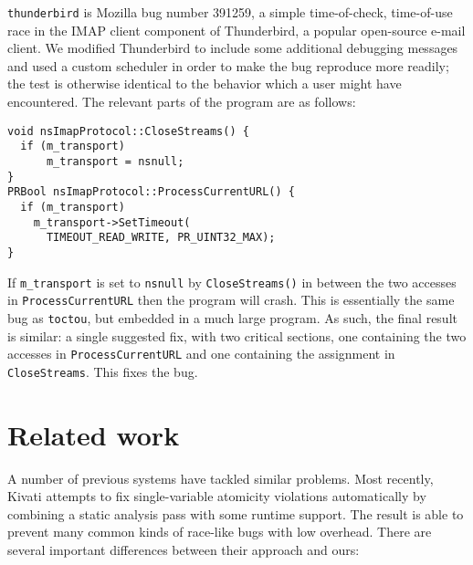 \documentclass[10pt,twocolumn,preprint,natbib,authoryear]{sigplanconf}
\newcommand{\editorial}[1]{}
\begin{document}
\verb|thunderbird| is Mozilla bug number
391259\cite{thunderbird39125}, a simple time-of-check, time-of-use
race in the IMAP client component of Thunderbird, a popular
open-source e-mail client.  We modified Thunderbird to include some
additional debugging messages and used a custom scheduler in order to
make the bug reproduce more readily; the test is otherwise identical
to the behavior which a user might have encountered.  The relevant
parts of the program are as follows:

\begin{verbatim}
void nsImapProtocol::CloseStreams() {
  if (m_transport)
      m_transport = nsnull;
}
PRBool nsImapProtocol::ProcessCurrentURL() {
  if (m_transport)
    m_transport->SetTimeout(
      TIMEOUT_READ_WRITE, PR_UINT32_MAX);
}
\end{verbatim}

\noindent
If \verb|m_transport| is set to \verb|nsnull| by \verb|CloseStreams()|
in between the two accesses in \verb|ProcessCurrentURL| then the
program will crash.  This is essentially the same bug as
\verb|toctou|, but embedded in a much large program.  As such, the
final result is similar: a single suggested fix, with two critical
sections, one containing the two accesses in \verb|ProcessCurrentURL|
and one containing the assignment in \verb|CloseStreams|.  This fixes
the bug.

\section{Related work}\editorial{This is a bit of a bestiary.  Could do with a bit more analysis.}

A number of previous systems have tackled similar problems.  Most
recently, Kivati\cite{Chew2010a} attempts to fix single-variable
atomicity violations automatically by combining a static analysis pass
with some runtime support.  The result is able to prevent many common
kinds of race-like bugs with low overhead.  There are several
important differences between their approach and ours:
\end{document}
